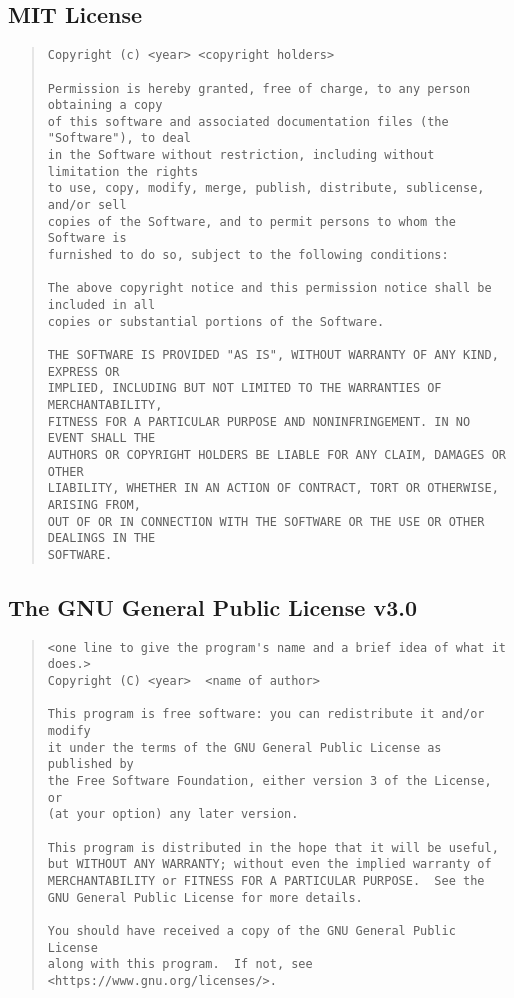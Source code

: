 \documentclass[12pt,a4paper]{article}
\begin{document}
\subsection{MIT License}

\begin{quote}
\begin{verbatim}
Copyright (c) <year> <copyright holders>

Permission is hereby granted, free of charge, to any person obtaining a copy
of this software and associated documentation files (the "Software"), to deal
in the Software without restriction, including without limitation the rights
to use, copy, modify, merge, publish, distribute, sublicense, and/or sell
copies of the Software, and to permit persons to whom the Software is
furnished to do so, subject to the following conditions:

The above copyright notice and this permission notice shall be included in all
copies or substantial portions of the Software.

THE SOFTWARE IS PROVIDED "AS IS", WITHOUT WARRANTY OF ANY KIND, EXPRESS OR
IMPLIED, INCLUDING BUT NOT LIMITED TO THE WARRANTIES OF MERCHANTABILITY,
FITNESS FOR A PARTICULAR PURPOSE AND NONINFRINGEMENT. IN NO EVENT SHALL THE
AUTHORS OR COPYRIGHT HOLDERS BE LIABLE FOR ANY CLAIM, DAMAGES OR OTHER
LIABILITY, WHETHER IN AN ACTION OF CONTRACT, TORT OR OTHERWISE, ARISING FROM,
OUT OF OR IN CONNECTION WITH THE SOFTWARE OR THE USE OR OTHER DEALINGS IN THE
SOFTWARE.
\end{verbatim}
\cite{mit-license}
\end{quote}

\subsection{The GNU General Public License v3.0}

\begin{quote}
\begin{verbatim}
<one line to give the program's name and a brief idea of what it does.>
Copyright (C) <year>  <name of author>

This program is free software: you can redistribute it and/or modify
it under the terms of the GNU General Public License as published by
the Free Software Foundation, either version 3 of the License, or
(at your option) any later version.

This program is distributed in the hope that it will be useful,
but WITHOUT ANY WARRANTY; without even the implied warranty of
MERCHANTABILITY or FITNESS FOR A PARTICULAR PURPOSE.  See the
GNU General Public License for more details.

You should have received a copy of the GNU General Public License
along with this program.  If not, see <https://www.gnu.org/licenses/>.
\end{verbatim}
\cite{gplv3}
\end{quote}





\end{document}

